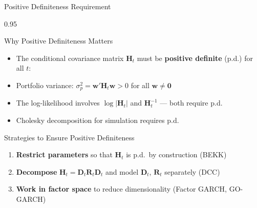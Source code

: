 \documentclass[9pt, aspectratio=169, t]{beamer}
\begin{document}
\begin{frame}{Positive Definiteness Requirement}
    \begin{cminipage}{0.95\textwidth}
    {\footnotesize
    \begin{block}{Why Positive Definiteness Matters}
        \begin{itemize}\setlength{\itemsep}{0pt}
            \item The conditional covariance matrix $\mathbf{H}_t$ must be \textbf{positive definite} (p.d.) for all $t$:
            \item Portfolio variance: $\sigma_p^2 = \mathbf{w}'\mathbf{H}_t\mathbf{w} > 0$ for all $\mathbf{w} \neq \mathbf{0}$
            \item The log-likelihood involves $\log|\mathbf{H}_t|$ and $\mathbf{H}_t^{-1}$ --- both require p.d.
            \item Cholesky decomposition for simulation requires p.d.
        \end{itemize}
    \end{block}
    \vspace{0.1cm}
    \begin{block}{Strategies to Ensure Positive Definiteness}
        \begin{enumerate}\setlength{\itemsep}{0pt}
            \item \textbf{Restrict parameters} so that $\mathbf{H}_t$ is p.d.\ by construction (BEKK)
            \item \textbf{Decompose} $\mathbf{H}_t = \mathbf{D}_t \mathbf{R}_t \mathbf{D}_t$ and model $\mathbf{D}_t$, $\mathbf{R}_t$ separately (DCC)
            \item \textbf{Work in factor space} to reduce dimensionality (Factor GARCH, GO-GARCH)
        \end{enumerate}
    \end{block}
    }
    \end{cminipage}
\end{frame}
\end{document}
